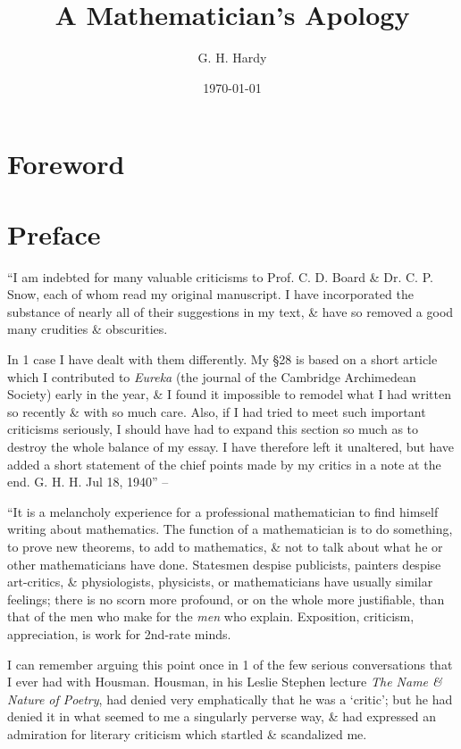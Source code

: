 \documentclass{article}
\title{A Mathematician's Apology}
\author{G. H. Hardy}
\date{\today}
\numberwithin{equation}{section}
\begin{document}
\maketitle
\tableofcontents


\section*{Foreword}


\section*{Preface}
``I am indebted for many valuable criticisms to Prof. C. D. Board \& Dr. C. P. Snow, each of whom read my original manuscript. I have incorporated the substance of nearly all of their suggestions in my text, \& have so removed a good many crudities \& obscurities.

In 1 case I have dealt with them differently. My \S28 is based on a short article which I contributed to \textit{Eureka} (the journal of the Cambridge Archimedean Society) early in the year, \& I found it impossible to remodel what I had written so recently \& with so much care. Also, if I had tried to meet such important criticisms seriously, I should have had to expand this section so much as to destroy the whole balance of my essay. I have therefore left it unaltered, but have added a short statement of the chief points made by my critics in a note at the end. G. H. H. Jul 18, 1940'' -- \cite[p. 59]{Hardy1992}

 ``It is a melancholy experience for a professional mathematician to find himself writing about mathematics. The function of a mathematician is to do something, to prove new theorems, to add to mathematics, \& not to talk about what he or other mathematicians have done. Statesmen despise publicists, painters despise art-critics, \& physiologists, physicists, or mathematicians have usually similar feelings; there is no scorn more profound, or on the whole more justifiable, than that of the men who make for the \textit{men} who explain. Exposition, criticism, appreciation, is work for 2nd-rate minds.

I can remember arguing this point once in 1 of the few serious conversations that I ever had with Housman. Housman, in his Leslie Stephen lecture \textit{The Name \& Nature of Poetry}, had denied very emphatically that he was a `critic'; but he had denied it in what seemed to me a singularly perverse way, \& had expressed an admiration for literary criticism which startled \& scandalized me.
\end{document}
